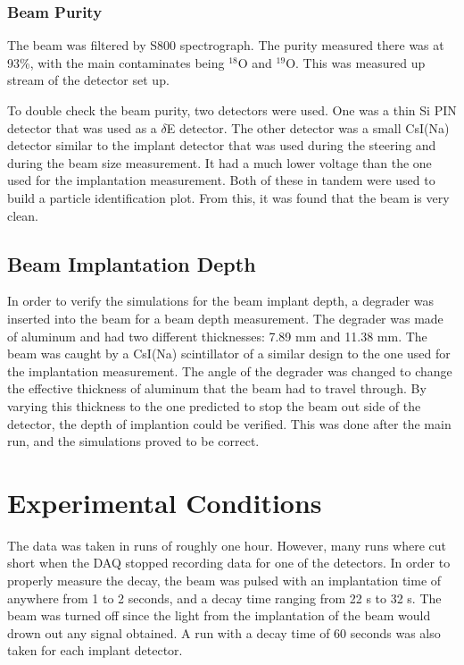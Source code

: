 \subsubsection{Beam Purity}
The beam was filtered by S800 spectrograph.
The purity measured there was at 93\%, with the main contaminates being $^{18}$O and $^{19}$O.
This was measured up stream of the detector set up. 

To double check the beam purity, two detectors were used.
One was a thin Si PIN detector that was used as a $\delta$E detector.
The other detector was a small CsI(Na) detector similar to the implant detector that was used during the steering and during the beam size measurement. 
It had a much lower voltage than the one used for the implantation measurement.
Both of these in tandem were used to build a particle identification plot.
From this, it was found that the beam is very clean.

\subsection{Beam Implantation Depth}
In order to verify the simulations for the beam implant depth, a degrader was inserted into the beam for a beam depth measurement.
The degrader was made of aluminum and had two different thicknesses: 7.89 mm and 11.38 mm.
The beam was caught by a CsI(Na) scintillator of a similar design to the one used for the implantation measurement.
The angle of the degrader was changed to change the effective thickness of aluminum that the beam had to travel through.
By varying this thickness to the one predicted to stop the beam out side of the detector, the depth of implantion could be verified.
This was done after the main run, and the simulations proved to be correct.

\section{Experimental Conditions}
The data was taken in runs of roughly one hour. 
However, many runs where cut short when the DAQ stopped recording data for one of the detectors.
In order to properly measure the decay, the beam was pulsed with an implantation time of anywhere from 1 to 2 seconds, and a decay time ranging from 22 s to 32 s. 
The beam was turned off since the light from the implantation of the beam would drown out any signal obtained. 
A run with a decay time of 60 seconds was also taken for each implant detector. 

